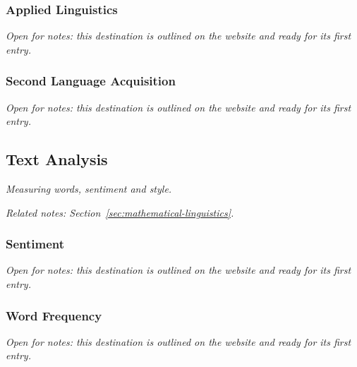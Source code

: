 \documentclass{article}
\newcounter{subsubsubsection}[subsubsection]
\begin{document}
\newpage 

\newpage 

\newpage 

\newpage 

\newpage 

\newpage 

\subsubsection{Applied Linguistics}\label{sec:applied-linguistics}
\textit{Open for notes: this destination is outlined on the website and ready for its first entry.}

\subsubsection{Second Language Acquisition}\label{sec:second-language-acquisition}
\textit{Open for notes: this destination is outlined on the website and ready for its first entry.}

\subsection{Text Analysis}\label{sec:text-analysis}
\textit{Measuring words, sentiment and style.}

\textit{Related notes: Section~\ref{sec:mathematical-linguistics}.}

\subsubsection{Sentiment}\label{sec:sentiment}
\textit{Open for notes: this destination is outlined on the website and ready for its first entry.}

\subsubsection{Word Frequency}\label{sec:word-frequency}
\textit{Open for notes: this destination is outlined on the website and ready for its first entry.}
\end{document}
